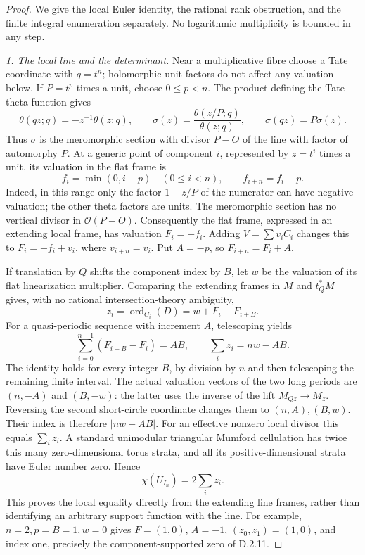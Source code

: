 \begin{proof}
We give the local Euler identity, the rational rank obstruction, and the
finite integral enumeration separately. No logarithmic multiplicity is
bounded in any step.

\emph{1. The local line and the determinant.}
Near a multiplicative fibre choose a Tate coordinate with $q=t^n$;
holomorphic unit factors do not affect any valuation below. If $P=t^p$
times a unit, choose $0\le p<n$. The product defining the Tate theta
function gives
\[
 \theta(qz;q)=-z^{-1}\theta(z;q),\qquad
 \sigma(z)=\frac{\theta(z/P;q)}{\theta(z;q)},\qquad
 \sigma(qz)=P\sigma(z).
\]
Thus $\sigma$ is the meromorphic section with divisor $P-O$ of the
line with factor of automorphy $P$. At a generic point of component
$i$, represented by $z=t^i$ times a unit, its valuation in the flat
frame is
\[
 f_i=\min(0,i-p)\quad(0\le i<n),\qquad f_{i+n}=f_i+p.
\]
Indeed, in this range only the factor $1-z/P$ of the numerator can
have negative valuation; the other theta factors are units. The
meromorphic section has no vertical divisor in $\mathcal O(P-O)$.
Consequently the flat frame, expressed in an extending local frame,
has valuation $F_i=-f_i$. Adding $V=\sum v_iC_i$ changes this to
$F_i=-f_i+v_i$, where $v_{i+n}=v_i$. Put $A=-p$, so
$F_{i+n}=F_i+A$.

If translation by $Q$ shifts the component index by $B$, let $w$ be
the valuation of its flat linearization multiplier. Comparing the
extending frames in $M$ and $t_Q^*M$ gives, with no rational
intersection-theory ambiguity,
\[
 z_i=\operatorname{ord}_{C_i}(D)=w+F_i-F_{i+B}.
\]
For a quasi-periodic sequence with increment $A$, telescoping yields
\[
 \sum_{i=0}^{n-1}(F_{i+B}-F_i)=AB,
 \qquad \sum_i z_i=nw-AB.                                    \tag{D.FI2}
\]
The identity holds for every integer $B$, by division by $n$ and
then telescoping the remaining finite interval. The actual valuation
vectors of the two long periods are $(n,-A)$ and $(B,-w)$: the latter
uses the inverse of the lift $M_{Qz}\to M_z$. Reversing the second
short-circle coordinate changes them to $(n,A),(B,w)$. Their index
is therefore $|nw-AB|$. For an effective nonzero local divisor this
equals $\sum_i z_i$. A standard unimodular triangular Mumford
cellulation has twice this many zero-dimensional torus strata, and
all its positive-dimensional strata have Euler number zero. Hence
\[
                  \chi(U_{I_n})=2\sum_i z_i.                  \tag{D.FI3}
\]
This proves the local equality directly from the extending line
frames, rather than identifying an arbitrary support function with
the line. For example, $n=2,p=B=1,w=0$ gives
$F=(1,0)$, $A=-1$, $(z_0,z_1)=(1,0)$, and index one, precisely
the component-supported zero of D.2.11.


\end{proof}
